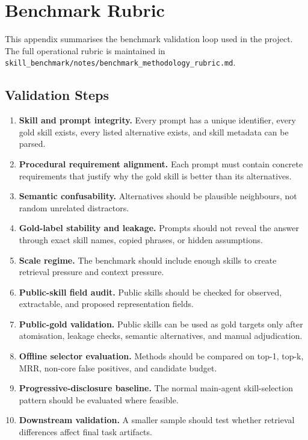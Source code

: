 \chapter{Benchmark Rubric}

This appendix summarises the benchmark validation loop used in the project. The full operational rubric is maintained in \texttt{skill\_benchmark/notes/benchmark\_methodology\_rubric.md}.

\section{Validation Steps}

\begin{enumerate}
  \item \textbf{Skill and prompt integrity.} Every prompt has a unique identifier, every gold skill exists, every listed alternative exists, and skill metadata can be parsed.
  \item \textbf{Procedural requirement alignment.} Each prompt must contain concrete requirements that justify why the gold skill is better than its alternatives.
  \item \textbf{Semantic confusability.} Alternatives should be plausible neighbours, not random unrelated distractors.
  \item \textbf{Gold-label stability and leakage.} Prompts should not reveal the answer through exact skill names, copied phrases, or hidden assumptions.
  \item \textbf{Scale regime.} The benchmark should include enough skills to create retrieval pressure and context pressure.
  \item \textbf{Public-skill field audit.} Public skills should be checked for observed, extractable, and proposed representation fields.
  \item \textbf{Public-gold validation.} Public skills can be used as gold targets only after atomisation, leakage checks, semantic alternatives, and manual adjudication.
  \item \textbf{Offline selector evaluation.} Methods should be compared on top-1, top-k, MRR, non-core false positives, and candidate budget.
  \item \textbf{Progressive-disclosure baseline.} The normal main-agent skill-selection pattern should be evaluated where feasible.
  \item \textbf{Downstream validation.} A smaller sample should test whether retrieval differences affect final task artifacts.
\end{enumerate}

